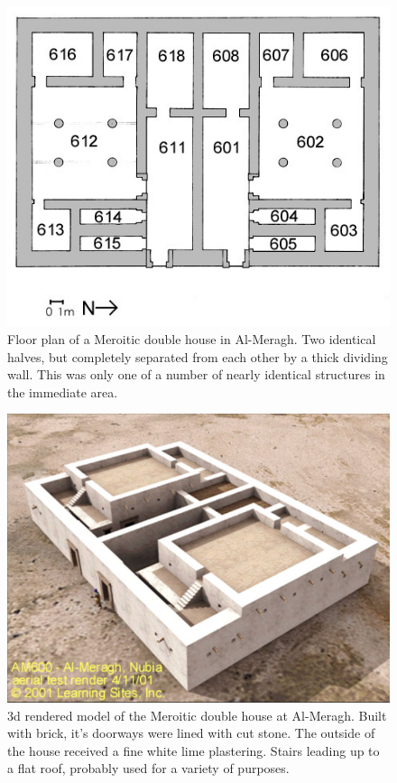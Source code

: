 \documentclass[a4paper,12pt]{scrreprt}
\begin{document}
\begin{figure}[H]
	\centering
	\includegraphics[width=\textwidth]{img/house/meroitic_double_house_floor_plan}
	\caption{Floor plan of a Meroitic double house in Al-Meragh. Two identical halves, but completely separated from each other by a thick dividing wall. This was only one of a number of nearly identical structures in the immediate area.}
\end{figure}

\begin{figure}[H]
	\centering
	\includegraphics[width=\textwidth]{img/house/3d_model_of_meroitic_double_house}
	\caption{3d rendered model of the Meroitic double house at Al-Meragh. Built with brick, it's doorways were lined with cut stone. The outside of the house received a fine white lime plastering. Stairs leading up to a flat roof, probably used for a variety of purposes.}
\end{figure}
\end{document}

